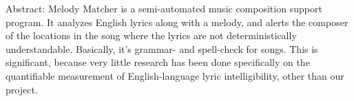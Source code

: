 \documentclass[10pt,oneside]{memoir}
\title{\mytitle}
\author{\myauthor}
\def\mychapterstyle{default}
\def\mypagestyle{headings}
\def\revision{}
\begin{document}
\chapterstyle{\mychapterstyle}
\pagestyle{\mypagestyle}

%
%

\frontmatter



\maketitle
\clearpage

\vspace*{\fill}

\setlength{\parindent}{0pt}

\ifx\mycopyright\undefined
\else
	\textcopyright{} \mycopyright
\fi

\revision

\begin{center}
\end{center}

\setlength{\parindent}{1em}
\clearpage

\tableofcontents


%
%


\setlength{\parindent}{1em}

\mainmatter
Abstract:
Melody Matcher is a semi-automated music composition support program. It analyzes English lyrics along with a melody, and alerts the composer of the locations in the song where the lyrics are not deterministically understandable. Basically, it's grammar- and spell-check for songs. This is significant, because very little research has been done specifically on the quantifiable measurement of English-language lyric intelligibility, other than our project.
\end{document}
